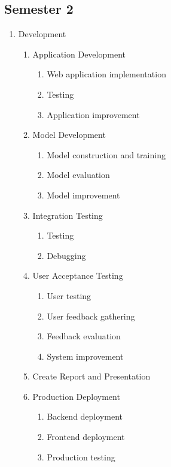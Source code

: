 \documentclass[12pt,oneside,openright,a4paper]{cpe-english-project}
\begin{document}
\subsection{Semester 2}
\begin{enumerate}
 \item Development
 \begin{enumerate}
  \item Application Development
  \begin{enumerate}
   \item Web application implementation
   \item Testing
   \item Application improvement
  \end{enumerate}
  \item Model Development
  \begin{enumerate}
   \item Model construction and training
   \item Model evaluation
   \item Model improvement
  \end{enumerate}
  \item Integration Testing
  \begin{enumerate}
   \item Testing
   \item Debugging
  \end{enumerate}
  \item User Acceptance Testing
  \begin{enumerate}
   \item User testing
   \item User feedback gathering
   \item Feedback evaluation
   \item System improvement
  \end{enumerate}
  \item Create Report and Presentation
  \item Production Deployment
  \begin{enumerate}
   \item Backend deployment
   \item Frontend deployment
   \item Production testing
  \end{enumerate}
 \end{enumerate}
\end{enumerate}
\end{document}
